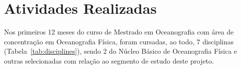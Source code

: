 \chapter{Atividades Realizadas}

\hspace{5mm} Nos primeiros 12 meses do curso de Mestrado em Oceanografia com área de concentração em Oceanografia Física, foram cursadas, ao todo, 7 disciplinas (Tabela~\ref{tab:disciplines}), sendo 2 do Núcleo Básico de Oceanografia Física e outras selecionadas com relação ao segmento de estudo deste projeto.


